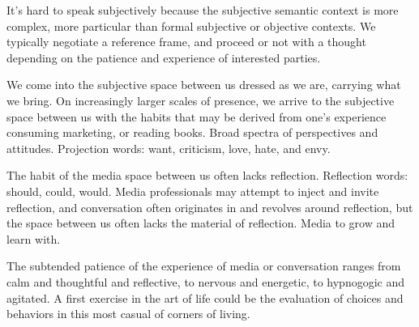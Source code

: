 

It's hard to speak subjectively because the subjective semantic
context is more complex, more particular than formal subjective or
objective contexts.  We typically negotiate a reference frame, and
proceed or not with a thought depending on the patience and experience
of interested parties.

We come into the subjective space between us dressed as we are,
carrying what we bring.  On increasingly larger scales of presence, we
arrive to the subjective space between us with the habits that may be
derived from one's experience consuming marketing, or reading books.
Broad spectra of perspectives and attitudes.  Projection words: want,
criticism, love, hate, and envy. 

The habit of the media space between us often lacks reflection.
Reflection words: should, could, would.  Media professionals may
attempt to inject and invite reflection, and conversation often
originates in and revolves around reflection, but the space between us
often lacks the material of reflection.  Media to grow and learn with.

The subtended patience of the experience of media or conversation
ranges from calm and thoughtful and reflective, to nervous and
energetic, to hypnogogic and agitated.  A first exercise in the art of
life could be the evaluation of choices and behaviors in this most
casual of corners of living.

\bye
